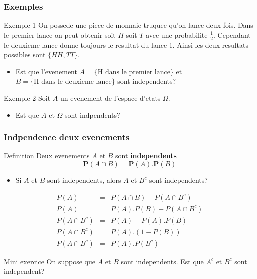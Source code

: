 \documentclass{beamer}
\begin{document}
\begin{frame}[t]
  \frametitle{Exemples}
 \begin{block}{Exemple 1}
  \scriptsize 
On possede une piece de monnaie truquee qu'on lance deux fois. Dans le premier
lance on peut obtenir soit $H$ soit $T$ avec une probabilite $\frac{1}{2}$.
Cependant le deuxieme lance donne toujours le resultat du lance 1. Ainsi les
deux resultats possibles sont $\{HH, TT\}$.
\begin{itemize}
  \item Est que l'evenement $A=\{\text{H dans le premier lance}\}$ et
    $B=\{\text{H dans le deuxieme lance}\}$ sont independents?
\end{itemize}
 \end{block} 

 \pause
 \begin{block}{Exemple 2}
   \scriptsize
   Soit $A$ un evenement de l'espace d'etats $\Omega$.\\[4pt]
  \begin{itemize}
    \item Est que $A$ et $\Omega$ sont indpendents? \end{itemize}
 \end{block}
\end{frame}

\begin{frame}[t]
  \frametitle{Indpendence deux evenements}
  \small
          \begin{block}{Definition}
            \scriptsize
            Deux evenements $A$ et $B$ sont \alert{\textbf{independents}} 
            $$
            \mathbf{P}(A\cap B) = \mathbf{P}(A).\mathbf{P}(B)
            $$
          \end{block}

          \begin{itemize}
            \item Si $A$ et $B$ sont independents, alors $A$ et $B^c$ sont
              independents?
          \end{itemize}
          \pause
          \begin{eqnarray*}
            P(A) &=& P(A\cap B) + P(A \cap B^c)\\
            P(A)  &=& P(A).P(B)   + P(A \cap B^c)\\
            P(A\cap B^c) &=& P(A) - P(A).P(B)\\
            P(A\cap B^c) &=& P(A).(1 - P(B))\\
            P(A\cap B^c) &=& P(A).P(B^c)
          \end{eqnarray*}

          \pause
          \begin{block}{Mini exercice}
            \scriptsize
            On suppose que $A$ et $B$ sont independents. Est que $A^c$ et $B^c$ sont
            independent?
            
          \end{block}
  
\end{frame}
\end{document}
